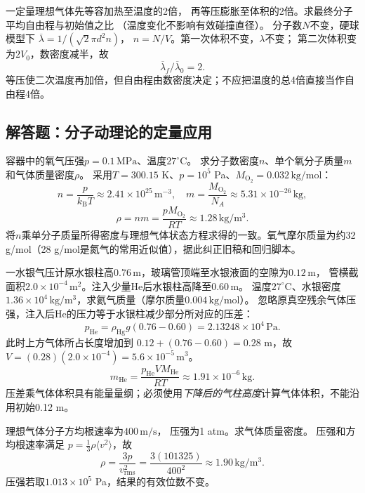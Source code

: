 \problemtext 一定量理想气体先等容加热至温度的2倍，
再等压膨胀至体积的2倍。求最终分子平均自由程与初始值之比
（温度变化不影响有效碰撞直径）。
\workings
分子数$N$不变，硬球模型下
$\overline\lambda=1/(\sqrt2\pi d^2n)$，
$n=N/V$。第一次体积不变，$\lambda$不变；
第二次体积变为$2V_0$，数密度减半，故
\[
\boxed{\overline\lambda_f/\overline\lambda_0=2}.
\]
\crosscheck 等压使二次温度再加倍，但自由程由数密度决定；不应把温度的总4倍直接当作自由程4倍。

\subsection{解答题：分子动理论的定量应用}

\problemtext 容器中的氧气压强$p=0.1\,\mathrm{MPa}$、温度$27^\circ\mathrm C$。
求分子数密度$n$、单个氧分子质量$m$和气体质量密度$\rho$。
\workings
采用$T=300.15$ K、$p=10^5$ Pa、$M_{\mathrm{O_2}}=0.032\,\mathrm{kg/mol}$：
\[
\boxed{n=\frac{p}{k_{\mathrm B}T}\approx
2.41\times10^{25}\,\mathrm{m^{-3}}},
\quad
\boxed{m=\frac{M_{\mathrm{O_2}}}{N_A}
\approx5.31\times10^{-26}\,\mathrm{kg}},
\]
\[
\boxed{\rho=nm=\frac{pM_{\mathrm{O_2}}}{RT}
\approx1.28\,\mathrm{kg/m^3}}.
\]
\crosscheck 将$n$乘单分子质量所得密度与理想气体状态方程求得的一致。氧气摩尔质量为约32 g/mol（28 g/mol是氮气的常用近似值），据此纠正旧稿和回归脚本。

\problemtext 一水银气压计原水银柱高$0.76\,\mathrm m$，玻璃管顶端至水银液面的空隙为$0.12\,\mathrm m$，
管横截面积$2.0\times10^{-4}\,\mathrm{m^2}$。注入少量He后水银柱高降至$0.60\,\mathrm m$。
温度$27^\circ\mathrm C$、水银密度$1.36\times10^4\,\mathrm{kg/m^3}$，求氦气质量（摩尔质量$0.004\,\mathrm{kg/mol}$）。
\workings
忽略原真空残余气体压强，注入后He的压力等于水银柱减少部分所对应的压差：
\[
p_{\mathrm{He}}=\rho_{\mathrm{Hg}}g(0.76-0.60)
=2.13248\times10^4\,\mathrm{Pa}.
\]
此时上方气体所占长度增加到
$0.12+(0.76-0.60)=0.28$ m，故
$V=(0.28)(2.0\times10^{-4})=5.6\times10^{-5}\,\mathrm{m^3}$。
\[
\boxed{m_{\mathrm{He}}
=\frac{p_{\mathrm{He}}VM_{\mathrm{He}}}{RT}
\approx1.91\times10^{-6}\,\mathrm{kg}}.
\]
\crosscheck 压差乘气体体积具有能量量纲；必须使用\emph{下降后的气柱高度}计算气体体积，不能沿用初始0.12 m。

\problemtext 理想气体分子方均根速率为$400\,\mathrm{m/s}$，
压强为1 atm。求气体质量密度。
\workings
压强和方均根速率满足
$p=\frac13\rho\langle v^2\rangle$，故
\[
\boxed{\rho=\frac{3p}{v_{\mathrm{rms}}^2}
=\frac{3(101325)}{400^2}
\approx1.90\,\mathrm{kg/m^3}}.
\]
\crosscheck 压强若取$1.013\times10^5$ Pa，结果的有效位数不变。

